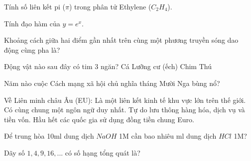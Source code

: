 \begin{ex}
    Tính số liên kết pi ($\pi$) trong phân tử Ethylene ($C_2H_4$).
\end{ex}

\begin{ex}
    Tính đạo hàm của $y = e^x$.
\end{ex}

\begin{ex}
    Khoảng cách giữa hai điểm gần nhất trên cùng một phương truyền sóng dao động cùng pha là?
\end{ex}

\begin{ex}
    Động vật nào sau đây có tim 3 ngăn?
    \choice
    {Cá}
    {\True Lưỡng cư (ếch)}
    {Chim}
    {Thú}
\end{ex}

\begin{ex}
    Năm nào cuộc Cách mạng xã hội chủ nghĩa tháng Mười Nga bùng nổ?
\end{ex}

\begin{ex}
    Về Liên minh châu Âu (EU):
    \choiceTF
    {\True Là một liên kết kinh tế khu vực lớn trên thế giới.}
    {Có cùng chung một ngôn ngữ duy nhất.}
    {\True Tự do lưu thông hàng hóa, dịch vụ và tiền vốn.}
    {\True Hầu hết các quốc gia sử dụng đồng tiền chung Euro.}
\end{ex}

\begin{ex}
    Để trung hòa 10ml dung dịch $NaOH$ 1M cần bao nhiêu ml dung dịch $HCl$ 1M?
\end{ex}

\begin{ex}
    Dãy số $1, 4, 9, 16, ...$ có số hạng tổng quát là?
\end{ex}

